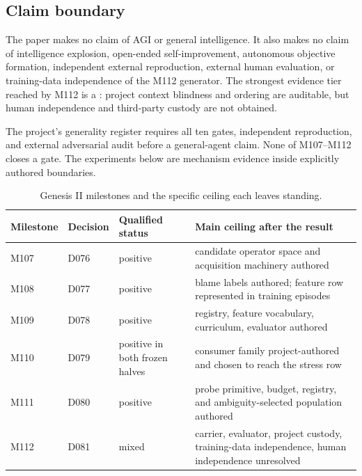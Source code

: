 \subsection{Claim boundary}
The paper makes no claim of AGI or general intelligence. It also makes no claim of intelligence explosion, open-ended self-improvement, autonomous objective formation, independent external reproduction, external human evaluation, or training-data independence of the M112 generator. The strongest evidence tier reached by M112 is a : project context blindness and ordering are auditable, but human independence and third-party custody are not obtained.

The project's generality register requires all ten gates, independent reproduction, and external adversarial audit before a general-agent claim. None of M107--M112 closes a gate. The experiments below are mechanism evidence inside explicitly authored boundaries.

\begin{table}[H]
\centering
\small
\caption{Genesis II milestones and the specific ceiling each leaves standing.}
\label{tab:milestones}
\begin{tabularx}{\textwidth}{@{}l l l X@{}}
\toprule
Milestone & Decision & Qualified status & Main ceiling after the result \\
\midrule
M107 & D076 & positive & candidate operator space and acquisition machinery authored \\
M108 & D077 & positive & blame labels authored; feature row represented in training episodes \\
M109 & D078 & positive & registry, feature vocabulary, curriculum, evaluator authored \\
M110 & D079 & positive in both frozen halves & consumer family project-authored and chosen to reach the stress row \\
M111 & D080 & positive & probe primitive, budget, registry, and ambiguity-selected population authored \\
M112 & D081 & mixed & carrier, evaluator, project custody, training-data independence, human independence unresolved \\
\bottomrule
\end{tabularx}
\end{table}

